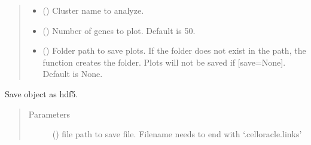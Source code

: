 \documentclass[letterpaper,10pt,english]{sphinxmanual}
\begin{document}
\begin{fulllineitems}
\begin{fulllineitems}
\begin{quote}
\begin{description}
\begin{itemize}
\item {} 
 () \textendash{} Cluster name to analyze.

\item {} 
 () \textendash{} Number of genes to plot. Default is 50.

\item {} 
 () \textendash{} Folder path to save plots. If the folder does not exist in the path, the function creates the folder.
Plots will not be saved if {[}save=None{]}. Default is None.

\end{itemize}

\end{description}\end{quote}

\end{fulllineitems}


\begin{fulllineitems}
\label{\detokenize{modules/celloracle:celloracle.Links.to_hdf5}}
Save object as hdf5.
\begin{quote}\begin{description}
\item[{Parameters}] \leavevmode
{} () \textendash{} file path to save file. Filename needs to end with ‘.celloracle.links’

\end{description}\end{quote}

\end{fulllineitems}


\end{fulllineitems}

\end{document}
